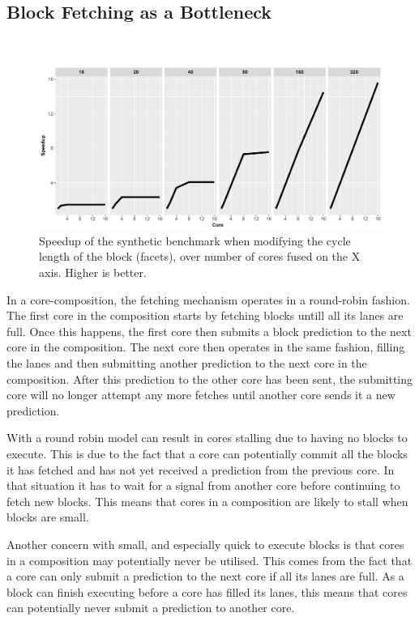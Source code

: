 \subsection{Block Fetching as a Bottleneck}~\label{ch3:sec:bfn}

\begin{figure}[h]
    \centering
    \includegraphics[width=1\textwidth]{chapter3/graphics/motivation_standard_fetch.pdf}

    \caption{Speedup of the synthetic benchmark when modifying the cycle length of the block (facets), over number of cores fused on the X axis. Higher is better.}
    \label{fig:block_graph}
\end{figure}

In a core-composition, the fetching mechanism operates in a round-robin fashion.
The first core in the composition starts by fetching blocks untill all its lanes are full.
Once this happens, the first core then submits a block prediction to the next core in the composition.
The next core then operates in the same fashion, filling the lanes and then submitting another prediction to the next core in the composition.
After this prediction to the other core has been sent, the submitting core will no longer attempt any more fetches until another core sends it a new prediction.

With a round robin model can result in cores stalling due to having no blocks to execute.
This is due to the fact that a core can potentially commit all the blocks it has fetched and has not yet received a prediction from the previous core.
In that situation it has to wait for a signal from another core before continuing to fetch new blocks.
This means that cores in a composition are likely to stall when blocks are small.

Another concern with small, and especially quick to execute blocks is that cores in a composition may potentially never be utilised.
This comes from the fact that a core can only submit a prediction to the next core if all its lanes are full.
As a block can finish executing before a core has filled its lanes, this means that cores can potentially never submit a prediction to another core.

